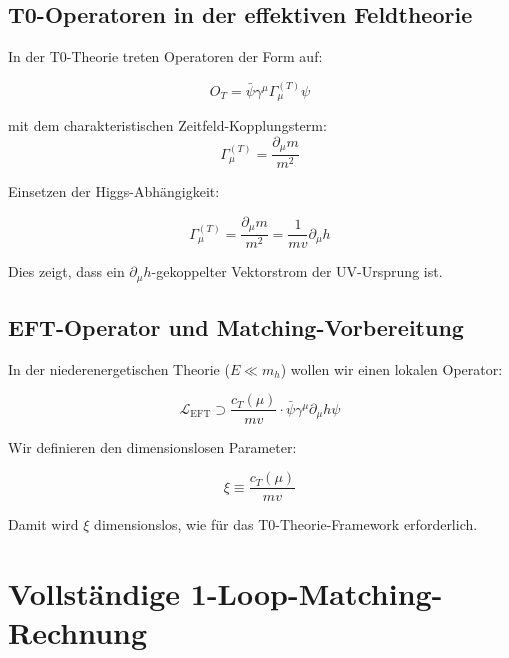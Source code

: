 	\subsection{T0-Operatoren in der effektiven Feldtheorie}
	
	In der T0-Theorie treten Operatoren der Form auf:
	
	\begin{equation}
		O_T = \bar{\psi}\gamma^\mu\Gamma_\mu^{(T)}\psi
	\end{equation}
	
	mit dem charakteristischen Zeitfeld-Kopplungsterm:
	\begin{equation}
		\Gamma_\mu^{(T)} = \frac{\partial_\mu m}{m^2}
	\end{equation}
	
	Einsetzen der Higgs-Abhängigkeit:
	
	\begin{formel}
		\begin{equation}
			\Gamma_\mu^{(T)} = \frac{\partial_\mu m}{m^2} = \frac{1}{mv}\partial_\mu h
		\end{equation}
		
		Dies zeigt, dass ein $\partial_\mu h$-gekoppelter Vektorstrom der UV-Ursprung ist.
	\end{formel}
	
	\subsection{EFT-Operator und Matching-Vorbereitung}
	
	In der niederenergetischen Theorie ($E \ll m_h$) wollen wir einen lokalen Operator:
	
	\begin{equation}
		\mathcal{L}_{\text{EFT}} \supset \frac{c_T(\mu)}{mv} \cdot \bar{\psi}\gamma^\mu\partial_\mu h \psi
	\end{equation}
	
	Wir definieren den dimensionslosen Parameter:
	
	\begin{formel}
		\begin{equation}
			\xi \equiv \frac{c_T(\mu)}{mv}
		\end{equation}
		
		Damit wird $\xi$ dimensionslos, wie für das T0-Theorie-Framework erforderlich.
	\end{formel}
	
	\section{Vollständige 1-Loop-Matching-Rechnung}
	
